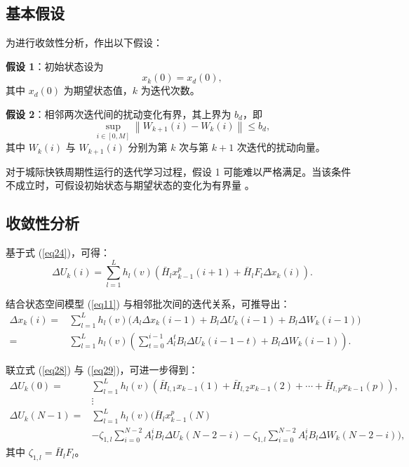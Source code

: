 \subsection{基本假设}

为进行收敛性分析，作出以下假设：

\textbf{假设 1}：初始状态设为
\begin{equation}
\label{eq26}
x_k(0)=x_d(0),
\end{equation}
其中 $x_d(0)$ 为期望状态值，$k$ 为迭代次数。

\textbf{假设 2}：相邻两次迭代间的扰动变化有界，其上界为 $b_d$，即
\begin{equation}
\label{eq27}
\sup _{i \in[0, M]}\left\|W_{k+1}(i)-W_k(i)\right\| \leq b_d,
\end{equation}
其中 $W_k(i)$ 与 $W_{k+1}(i)$ 分别为第 $k$ 次与第 $k+1$ 次迭代的扰动向量。

对于城际快铁周期性运行的迭代学习过程，假设 1 可能难以严格满足。当该条件不成立时，可假设初始状态与期望状态的变化为有界量 \cite{Yan2016}。

\subsection{收敛性分析}

基于式 (\ref{eq24})，可得：
\begin{equation}
	\label{eq28}
\Delta U_k(i)=\sum_{l=1}^{L} h_l(v) \left( \bar{H}_l x_{k-1}^p(i+1) + \bar{H}_l F_l \Delta x_k(i) \right).
\end{equation}

结合状态空间模型 (\ref{eq11}) 与相邻批次间的迭代关系，可推导出：
\begin{equation}
\begin{aligned}
\Delta x_k(i) = & \sum_{l=1}^{L} h_l(v) \Big( A_l \Delta x_k(i-1) + B_l \Delta U_k(i-1) + B_l \Delta W_k(i-1) \Big) \\
= & \sum_{l=1}^{L} h_l(v) \left( \sum_{t=0}^{i-1} A_l^t B_l \Delta U_k(i-1-t) + B_l \Delta W_k(i-1) \right).
\end{aligned}
\label{eq29}
\end{equation}

联立式 (\ref{eq28}) 与 (\ref{eq29})，可进一步得到：
\begin{equation}
\begin{aligned}
\Delta U_k(0) = & \sum_{l=1}^{L} h_l(v) \left( \bar{H}_{l,1} x_{k-1}(1) + \bar{H}_{l,2} x_{k-1}(2) + \cdots + \bar{H}_{l,p} x_{k-1}(p) \right), \\
& \vdots \\
\Delta U_k(N-1) = & \sum_{l=1}^{L} h_l(v) \Bigg( \bar{H}_l x_{k-1}^p(N) \\
& - \zeta_{1,l} \sum_{i=0}^{N-2} A_l^i B_l \Delta U_k(N-2-i) - \zeta_{1,l} \sum_{i=0}^{N-2} A_l^i B_l \Delta W_k(N-2-i) \Bigg),
\end{aligned}
\label{eq30}
\end{equation}
其中 $\zeta_{1,l} = \bar{H}_l F_l$。

